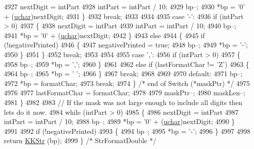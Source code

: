 \begin{DoxyCode}
4927              nextDigit = intPart %
4928              intPart = intPart / 10;
4929              bp--;
4930              *bp = \textcolor{charliteral}{'0'} + (\hyperlink{namespace_k_k_b_ace9969169bf514f9ee6185186949cdf7}{uchar})nextDigit;
4931            \}
4932            \textcolor{keywordflow}{break};
4933 
4934 
4935       \textcolor{keywordflow}{case}  \textcolor{charliteral}{'-'}:
4936            \textcolor{keywordflow}{if}  (intPart > 0)
4937            \{
4938              nextDigit = intPart %
4939              intPart = intPart / 10;
4940              bp--;
4941              *bp = \textcolor{charliteral}{'0'} + (\hyperlink{namespace_k_k_b_ace9969169bf514f9ee6185186949cdf7}{uchar})nextDigit;
4942            \}
4943            \textcolor{keywordflow}{else}
4944            \{
4945              \textcolor{keywordflow}{if}  (!negativePrinted)
4946              \{
4947                negativePrinted = \textcolor{keyword}{true};
4948                bp--;
4949                *bp = \textcolor{charliteral}{'-'};
4950              \}
4951            \}
4952            \textcolor{keywordflow}{break};
4953 
4954 
4955       \textcolor{keywordflow}{case}  \textcolor{charliteral}{','}:
4956            \textcolor{keywordflow}{if}  (intPart > 0)
4957            \{
4958              bp--;
4959              *bp = \textcolor{charliteral}{','};
4960            \}
4961 
4962            \textcolor{keywordflow}{else} \textcolor{keywordflow}{if}  (lastFormatChar != \textcolor{charliteral}{'Z'})
4963            \{
4964              bp--;
4965              *bp = \textcolor{charliteral}{' '};
4966            \}
4967            \textcolor{keywordflow}{break};
4968        
4969 
4970       \textcolor{keywordflow}{default}:
4971            bp--;
4972            *bp = formatChar;
4973            \textcolor{keywordflow}{break};
4974     \}  \textcolor{comment}{/* end of Switch (*maskPtr) */}
4975 
4976 
4977     lastFormatChar = formatChar;
4978 
4979     maskPtr--;
4980     maskLen--;
4981   \}
4982   
4983   \textcolor{comment}{// If the mask was not large enough to include all digits then lets do it now.}
4984   \textcolor{keywordflow}{while}  (intPart > 0)
4985   \{
4986     nextDigit = intPart %
4987     intPart = intPart / 10;
4988     bp--;
4989     *bp = \textcolor{charliteral}{'0'} + (\hyperlink{namespace_k_k_b_ace9969169bf514f9ee6185186949cdf7}{uchar})nextDigit;
4990   \}
4991 
4992   \textcolor{keywordflow}{if}  (!negativePrinted)
4993   \{
4994     bp--;
4995     *bp = \textcolor{charliteral}{'-'};
4996   \}
4997 
4998   \textcolor{keywordflow}{return}  \hyperlink{class_k_k_b_1_1_k_k_str}{KKStr} (bp);
4999 \}  \textcolor{comment}{/* StrFormatDouble */}
\end{DoxyCode}
